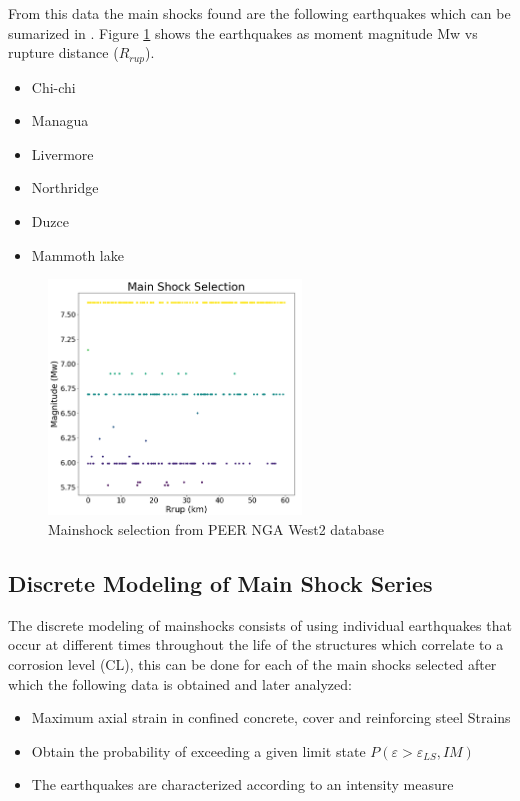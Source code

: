 From this data the main shocks found are the following earthquakes which can be sumarized in . Figure \ref{fig:MS_Selection} shows the earthquakes as moment magnitude {Mw} vs rupture distance ($R_{rup}$).

\begin{itemize}
	\item Chi-chi
	\item Managua
	\item Livermore
	\item Northridge
	\item Duzce 
	\item Mammoth lake
\end{itemize}

\begin{figure}[htbp]
	\centering
	\includegraphics[width=0.6\textwidth]{Chapter-4/figs/MainShock_Selection}
	\caption{Mainshock selection from PEER NGA West2 database}
	\label{fig:MS_Selection}
\end{figure}

\subsection{Discrete Modeling of Main Shock Series}
The discrete modeling of mainshocks consists of using individual earthquakes that occur at different times throughout the life of the structures which correlate to a corrosion level (CL), this can be done for each of the main shocks selected after which the following data is obtained and later analyzed:

\begin{itemize}
	\item Maximum axial strain in confined concrete, cover and reinforcing steel 
Strains
	\item Obtain the probability of exceeding a given limit state $P(\varepsilon >\varepsilon_{LS},IM)$
	\item The earthquakes are characterized according to an intensity measure

\end{itemize}


